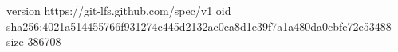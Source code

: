 version https://git-lfs.github.com/spec/v1
oid sha256:4021a514455766f931274c445d2132ac0ca8d1e39f7a1a480da0cbfe72e53488
size 386708
